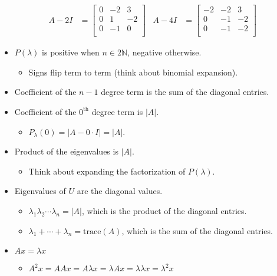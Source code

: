 \documentclass{article}
\begin{document}
\begin{itemize}
\begin{align*}
        A-2I &=
        \begin{bmatrix}
            0 & -2 & 3\\
            0 & 1 & -2\\
            0 & -1 & 0\\
        \end{bmatrix}&
        A-4I &=
        \begin{bmatrix}
            -2 & -2 & 3\\
            0 & -1 & -2\\
            0 & -1 & -2\\
        \end{bmatrix}&
    \end{align*}
    \item $P(\lambda)$ is positive when $n\in 2\mathbb{N}$, negative otherwise.
    \begin{itemize}
        \item Signs flip term to term (think about binomial expansion).
    \end{itemize}
    \item Coefficient of the $n-1$ degree term is the sum of the diagonal entries.
    \item Coefficient of the $0^\text{th}$ degree term is $|A|$.
    \begin{itemize}
        \item $P_\lambda(0) = |A-0\cdot I| = |A|$.
    \end{itemize}
    \item Product of the eigenvalues is $|A|$.
    \begin{itemize}
        \item Think about expanding the factorization of $P(\lambda)$.
    \end{itemize}
    \item Eigenvalues of $U$ are the diagonal values.
    \begin{itemize}
        \item $\lambda_1\lambda_2\cdots\lambda_n=|A|$, which is the product of the diagonal entries.
        \item $\lambda_1+\cdots+\lambda_n=\text{trace}(A)$, which is the sum of the diagonal entries.
    \end{itemize}
    \item $Ax=\lambda x$
    \begin{itemize}
        \item $A^2x=AAx=A\lambda x=\lambda Ax=\lambda\lambda x=\lambda^2x$
    \end{itemize}
\end{itemize}
\end{document}
